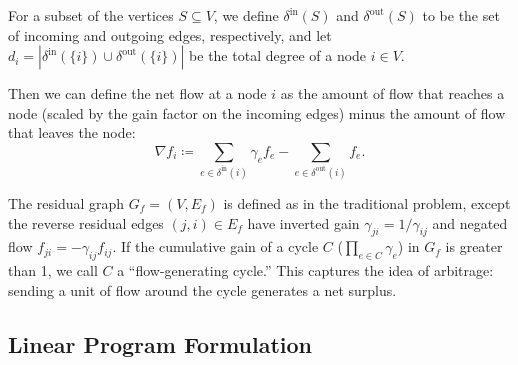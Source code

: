 \documentclass[11pt]{article}
\theoremstyle{definition}
\theoremstyle{definition}
\newcommand{\nfi}{\nabla f_i}
\newcommand{\din}{\delta^{\text{in}}}
\newcommand{\dout}{\delta^{\text{out}}}
\begin{document}
	For a subset of the vertices $S \subseteq V$, we define $\din(S)$ and
	$\dout(S)$ to be the set of incoming and outgoing edges, respectively,
	and let $d_i = |\din(\{i\}) \cup \dout(\{i\})|$ be the total degree of a
	node $i \in V$.

	Then we can define the net flow at a node $i$ as the amount of flow that
	reaches a node (scaled by the gain factor on the incoming edges) minus the
	amount of flow that leaves the node: 
	$$ \nfi \coloneqq \sum_{e \in \din(i)} \gamma_e f_e - \sum_{e \in \dout(i)} f_e.$$

	The residual graph $G_f = (V,E_f)$ is defined as in the traditional problem,
	except the reverse residual edges $(j,i) \in E_f$ have inverted gain 
	$\gamma_{ji} = 1 / \gamma_{ij}$ and negated flow $f_{ji} =
	-\gamma_{ij}f_{ij}$. If the cumulative gain of a cycle $C$ ($\prod_{e \in C} \gamma_e$)
	in $G_f$ is greater than 1, we call $C$ a ``flow-generating cycle.'' 
	This captures the idea of arbitrage: sending a unit of flow around the cycle
	generates a net surplus.





	\subsection{Linear Program Formulation}
	\label{sec:lp}
\end{document}
